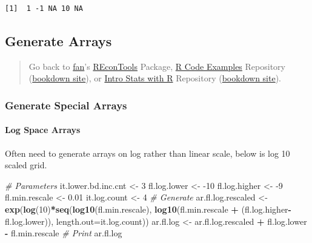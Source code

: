 \documentclass[
]{book}
\newenvironment{Shaded}{\begin{snugshade}}{\end{snugshade}}
\newcommand{\CommentTok}[1]{\textcolor[rgb]{0.56,0.35,0.01}{\textit{#1}}}
\newcommand{\DataTypeTok}[1]{\textcolor[rgb]{0.13,0.29,0.53}{#1}}
\newcommand{\DecValTok}[1]{\textcolor[rgb]{0.00,0.00,0.81}{#1}}
\newcommand{\FloatTok}[1]{\textcolor[rgb]{0.00,0.00,0.81}{#1}}
\newcommand{\KeywordTok}[1]{\textcolor[rgb]{0.13,0.29,0.53}{\textbf{#1}}}
\newcommand{\NormalTok}[1]{#1}
\newcommand{\OperatorTok}[1]{\textcolor[rgb]{0.81,0.36,0.00}{\textbf{#1}}}
\newcommand{\StringTok}[1]{\textcolor[rgb]{0.31,0.60,0.02}{#1}}
\begin{document}
\begin{verbatim}
[1]  1 -1 NA 10 NA
\end{verbatim}

\hypertarget{generate-arrays}{%
\subsection{Generate Arrays}\label{generate-arrays}}

\begin{quote}
Go back to \href{http://fanwangecon.github.io/}{fan}'s \href{https://fanwangecon.github.io/REconTools/}{REconTools} Package, \href{https://fanwangecon.github.io/R4Econ/}{R Code Examples} Repository (\href{https://fanwangecon.github.io/R4Econ/bookdown}{bookdown site}), or \href{https://fanwangecon.github.io/Stat4Econ/}{Intro Stats with R} Repository (\href{https://fanwangecon.github.io/Stat4Econ/bookdown}{bookdown site}).
\end{quote}

\hypertarget{generate-special-arrays}{%
\subsubsection{Generate Special Arrays}\label{generate-special-arrays}}

\hypertarget{log-space-arrays}{%
\paragraph{Log Space Arrays}\label{log-space-arrays}}

Often need to generate arrays on log rather than linear scale, below is log 10 scaled grid.

\begin{Shaded}
\begin{Highlighting}[]
\CommentTok{# Parameters}
\NormalTok{it.lower.bd.inc.cnt <-}\StringTok{ }\DecValTok{3}
\NormalTok{fl.log.lower <-}\StringTok{ }\DecValTok{-10}
\NormalTok{fl.log.higher <-}\StringTok{ }\DecValTok{-9}
\NormalTok{fl.min.rescale <-}\StringTok{ }\FloatTok{0.01}
\NormalTok{it.log.count <-}\StringTok{ }\DecValTok{4}
\CommentTok{# Generate}
\NormalTok{ar.fl.log.rescaled <-}\StringTok{ }\KeywordTok{exp}\NormalTok{(}\KeywordTok{log}\NormalTok{(}\DecValTok{10}\NormalTok{)}\OperatorTok{*}\KeywordTok{seq}\NormalTok{(}\KeywordTok{log10}\NormalTok{(fl.min.rescale),}
                                      \KeywordTok{log10}\NormalTok{(fl.min.rescale }\OperatorTok{+}
\StringTok{                                              }\NormalTok{(fl.log.higher}\OperatorTok{-}\NormalTok{fl.log.lower)),}
                                      \DataTypeTok{length.out=}\NormalTok{it.log.count))}
\NormalTok{ar.fl.log <-}\StringTok{ }\NormalTok{ar.fl.log.rescaled }\OperatorTok{+}\StringTok{ }\NormalTok{fl.log.lower }\OperatorTok{-}\StringTok{ }\NormalTok{fl.min.rescale}
\CommentTok{# Print}
\NormalTok{ar.fl.log}
\end{Highlighting}
\end{Shaded}
\end{document}
